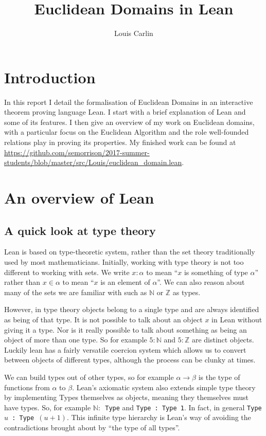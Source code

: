\documentclass{article}
\author{Louis Carlin}
\title{Euclidean Domains in Lean}
\newcommand{\Z}{\ensuremath{\mathbb{Z}}}
\newcommand{\N}{\ensuremath{\mathbb{N}}}
\renewcommand{\a}{\alpha}
\newcommand{\ct}{\texttt}
\begin{document}
\maketitle
\newpage 

\section*{Introduction}
In this report I detail the formalisation of Euclidean Domains in an interactive theorem proving language Lean. I start with a brief explanation of Lean and some of its features. I then give an overview of my work on Euclidean domains, with a particular focus on the Euclidean Algorithm and the role well-founded relations play in proving its properties. My finished work can be found at \url{https://github.com/semorrison/2017-summer-students/blob/master/src/Louis/euclidean\_domain.lean}.

\section{An overview of Lean}

\subsection{A quick look at type theory}
Lean is based on type-theoretic system, rather than the set theory traditionally used by most mathematicians. 
Initially, working with type theory is not too different to working with sets. 
We write $x:\a$ to mean ``$x$ is something of type $\a$'' rather than $x \in \a$ to mean ``$x$ is an element of $\a$''. 
We can also reason about many of the sets we are familiar with such as $\N$ or $\Z$ as types.

However, in type theory objects belong to a single type and are always identified as being of that type.
It is not possible to talk about an object $x$ in Lean without giving it a type.
Nor is it really possible to talk about something as being an object of more than one type.
So for example $5:\N$ and $5:\Z$ are distinct objects.
Luckily lean has a fairly versatile coercion system which allows us to convert between objects of different types, although the process can be clunky at times.

We can build types out of other types, so for example $\a \to \beta$ is the type of functions from $\a$ to $\beta$. 
Lean's axiomatic system also extends simple type theory by implementing Types themselves as objects, meaning they themselves must have types.
So, for example \ct{$\N:$ Type} and \ct{Type : Type 1}.
In fact, in general \ct{Type $u$ : Type $(u+1)$}. 
This infinite type hierarchy is Lean's way of avoiding the contradictions brought about by ``the type of all types''.
\end{document}
